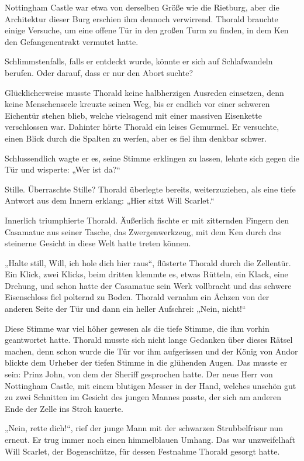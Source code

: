 \documentclass[10pt, a4paper, oneside]{book}
\begin{document}
Nottingham Castle war etwa von derselben Größe wie die Rietburg, aber die Architektur dieser Burg erschien ihm dennoch verwirrend. Thorald brauchte einige Versuche, um eine offene Tür in den großen Turm zu finden, in dem Ken den Gefangenentrakt vermutet hatte.

Schlimmstenfalls, falls er entdeckt wurde, könnte er sich auf Schlafwandeln berufen. Oder darauf, dass er nur den Abort suchte?

Glücklicherweise musste Thorald keine halbherzigen Ausreden einsetzen, denn keine Menschenseele kreuzte seinen Weg, bis er endlich vor einer schweren Eichentür stehen blieb, welche vielsagend mit einer massiven Eisenkette verschlossen war. Dahinter hörte Thorald ein leises Gemurmel. Er versuchte, einen Blick durch die Spalten zu werfen, aber es fiel ihm denkbar schwer.

Schlussendlich wagte er es, seine Stimme erklingen zu lassen, lehnte sich gegen die Tür und wisperte: „Wer ist da?“

Stille. Überraschte Stille? Thorald überlegte bereits, weiterzuziehen, als eine tiefe Antwort aus dem Innern erklang: „Hier sitzt Will Scarlet.“

Innerlich triumphierte Thorald. Äußerlich fischte er mit zitternden Fingern den Casamatuc aus seiner Tasche, das Zwergenwerkzeug, mit dem Ken durch das steinerne Gesicht in diese Welt hatte treten können.

„Halte still, Will, ich hole dich hier raus“, flüsterte Thorald durch die Zellentür. Ein Klick, zwei Klicks, beim dritten klemmte es, etwas Rütteln, ein Klack, eine Drehung, und schon hatte der Casamatuc sein Werk vollbracht und das schwere Eisenschloss fiel polternd zu Boden. Thorald vernahm ein Ächzen von der anderen Seite der Tür und dann ein heller Aufschrei: „Nein, nicht!“

Diese Stimme war viel höher gewesen als die tiefe Stimme, die ihm vorhin geantwortet hatte. Thorald musste sich nicht lange Gedanken über dieses Rätsel machen, denn schon wurde die Tür vor ihm aufgerissen und der König von Andor blickte dem Urheber der tiefen Stimme in die glühenden Augen. Das musste er sein: Prinz John, von dem der Sheriff gesprochen hatte. Der neue Herr von Nottingham Castle, mit einem blutigen Messer in der Hand, welches unschön gut zu zwei Schnitten im Gesicht des jungen Mannes passte, der sich am anderen Ende der Zelle ins Stroh kauerte.

„Nein, rette dich!“, rief der junge Mann mit der schwarzen Strubbelfrisur nun erneut. Er trug immer noch einen himmelblauen Umhang. Das war unzweifelhaft Will Scarlet, der Bogenschütze, für dessen Festnahme Thorald gesorgt hatte.
\end{document}

